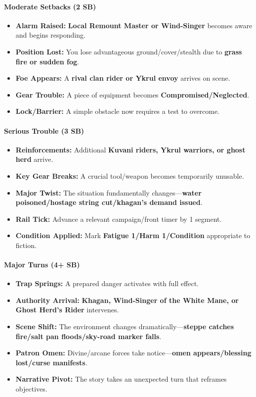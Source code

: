 \paragraph{Moderate Setbacks (2 SB)}
\begin{itemize}
\item \textbf{Alarm Raised:} \textbf{Local Remount Master or Wind-Singer} becomes aware and begins responding.
\item \textbf{Position Lost:} You lose advantageous ground/cover/stealth due to \textbf{grass fire or sudden fog}.
\item \textbf{Foe Appears:} A \textbf{rival clan rider or Ykrul envoy} arrives on scene.
\item \textbf{Gear Trouble:} A piece of equipment becomes \textbf{Compromised/Neglected}.
\item \textbf{Lock/Barrier:} A simple obstacle now requires a test to overcome.
\end{itemize}

\paragraph{Serious Trouble (3 SB)}
\begin{itemize}
\item \textbf{Reinforcements:} Additional \textbf{Kuvani riders, Ykrul warriors, or ghost herd} arrive.
\item \textbf{Key Gear Breaks:} A crucial tool/weapon becomes temporarily unusable.
\item \textbf{Major Twist:} The situation fundamentally changes---\textbf{water poisoned/hostage string cut/khagan's demand issued}.
\item \textbf{Rail Tick:} Advance a relevant campaign/front timer by 1 segment.
\item \textbf{Condition Applied:} Mark \textbf{Fatigue 1/Harm 1/Condition} appropriate to fiction.
\end{itemize}

\paragraph{Major Turns (4+ SB)}
\begin{itemize}
\item \textbf{Trap Springs:} A prepared danger activates with full effect.
\item \textbf{Authority Arrival:} \textbf{Khagan, Wind-Singer of the White Mane, or Ghost Herd's Rider} intervenes.
\item \textbf{Scene Shift:} The environment changes dramatically---\textbf{steppe catches fire/salt pan floods/sky-road marker falls}.
\item \textbf{Patron Omen:} Divine/arcane forces take notice---\textbf{omen appears/blessing lost/curse manifests}.
\item \textbf{Narrative Pivot:} The story takes an unexpected turn that reframes objectives.
\end{itemize}

